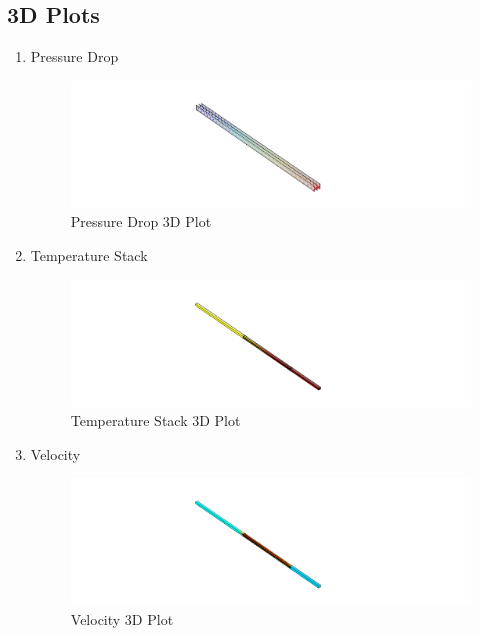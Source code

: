         \subsection{3D Plots}
            \begin{enumerate}
                \item Pressure Drop
                    \begin{figure}[H]
                        \centering
                        \includegraphics[width=1\textwidth]{00_Images/00_Pressure.png}
                        \caption{Pressure Drop 3D Plot}
                    \end{figure}
                \item Temperature Stack
                    \begin{figure}[H]
                        \centering
                        \includegraphics[width=1\textwidth]{00_Images/00_Temperature.png}
                        \caption{Temperature Stack 3D Plot}
                    \end{figure}
                \item Velocity 
                    \begin{figure}
                        \centering
                        \includegraphics[width=1\textwidth]{00_Images/00_Velocity.png}
                        \caption{Velocity 3D Plot}
                    \end{figure}
            \end{enumerate}